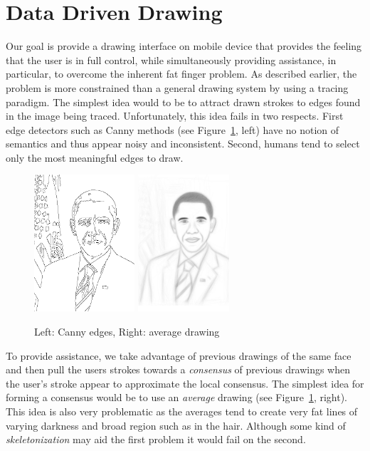 \section{Data Driven Drawing}

Our goal is provide a drawing interface on mobile device that provides the feeling that the user is in full control, while simultaneously providing assistance, in particular, to overcome the inherent fat finger problem. As described earlier, the problem is more constrained than a general drawing system by using a tracing paradigm. The simplest idea would to be to attract drawn strokes to edges found in the image being traced. Unfortunately, this idea fails in two respects. First edge detectors such as Canny methods (see Figure~\ref{fig:edges}, left) have no notion of semantics and thus appear noisy and inconsistent. Second, humans tend to select only the most meaningful edges to draw.

\begin{figure}
  \centering%
\includegraphics[height=2in]{figures/imagetable/edges_bo.png}
\hspace{0.1in}
\includegraphics[height=2in]{figures/imagetable/avg_bo.png}
  \caption{Left: Canny edges, Right: average drawing}
  \label{fig:edges}
\end{figure}

To provide assistance, we take advantage of previous drawings of the same face and then pull the users strokes towards a {\em consensus} of previous drawings when the user's stroke appear to approximate the local consensus. The simplest idea for forming a consensus would be to use an {\em average} drawing (see Figure~\ref{fig:edges}, right). This idea is also very problematic as the averages tend to create very fat lines of varying darkness and broad region such as in the hair. Although some kind of {\em skeletonization} may aid the first problem it would fail on the second.

